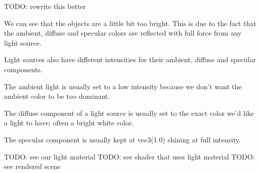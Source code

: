 TODO: rewrite this better

We can see that the objects are a little bit too bright.
This is due to the fact that the ambient, diffuse and specular colors are reflected
with full force from any light source.

Light sources also have different intensities for their ambient, diffuse and
specular components.

The ambient light is usually set to a low intensity because we don't want the
ambient color to be too dominant.

The diffuse component of a light source is usually set to the exact
color we'd like a light to have; often a bright white color.

The specular component is usually kept at vec3(1.0) shining at full intensity.

TODO: see our light material
TODO: see shader that uses light material
TODO: see rendered scene
